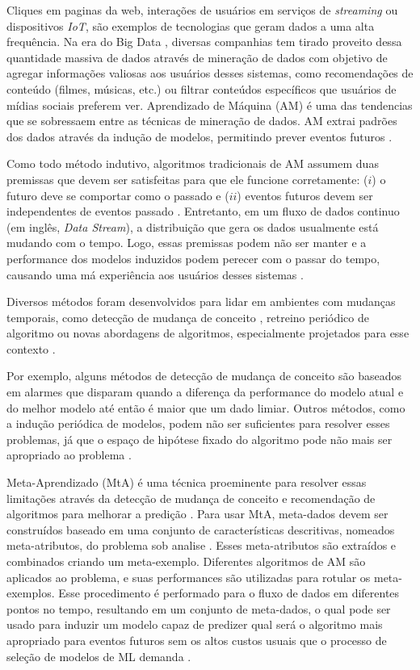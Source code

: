 Cliques em paginas da web, interações de usuários em serviços de \textit{streaming} ou dispositivos \textit{IoT}, são exemplos de tecnologias que geram dados a uma alta frequência.
Na era do Big Data \cite{tarnoff2018big, finger2014data},
diversas companhias tem tirado proveito dessa quantidade massiva de dados através de mineração de dados com objetivo de agregar informações valiosas aos usuários desses sistemas, como recomendações de conteúdo (filmes, músicas, etc.) ou filtrar conteúdos específicos que usuários de mídias sociais preferem ver. Aprendizado de Máquina (AM) é uma das tendencias que se sobressaem entre as técnicas de mineração de dados. AM extrai padrões dos dados através da indução de modelos, permitindo prever eventos futuros \cite{Mitchell1997}.

Como todo método indutivo, algoritmos tradicionais de AM assumem duas premissas que devem ser satisfeitas para que ele funcione corretamente: ($i$) o futuro deve se comportar como o passado e ($ii$) eventos futuros devem ser independentes de eventos passado \cite{vapnik2013nature}.
Entretanto, em um fluxo de dados continuo (em inglês, \textit{Data Stream}), a distribuição que gera os dados usualmente está mudando com o tempo.
Logo, essas premissas podem não ser manter e a performance dos modelos induzidos podem perecer com o passar do tempo, causando uma má experiência aos usuários desses sistemas  \cite{gama2007learning, Johansson2014}. 

Diversos métodos foram desenvolvidos para lidar em ambientes com mudanças temporais, como detecção de mudança de conceito \cite{klinkenberg2000detecting}, retreino periódico de algoritmo \cite{bifet2007learning} ou novas abordagens de algoritmos, especialmente projetados para esse contexto \cite{zang2014comparative}.

Por exemplo, alguns métodos de detecção de mudança de conceito \cite{gama2010knowledge} são baseados em alarmes que disparam quando a diferença da performance do modelo atual e do melhor modelo até então é maior que um dado limiar.
Outros métodos, como a indução periódica de modelos, podem não ser suficientes para resolver esses problemas, já que o espaço de hipótese fixado do algoritmo pode não mais ser apropriado ao problema \cite{rossi2014metastream}.

Meta-Aprendizado (MtA) é uma técnica proeminente para resolver essas limitações através da detecção de mudança de conceito e recomendação de algoritmos para melhorar a predição \cite{Anderson2019,VanRijn2016,Zarmehri2015}.
Para usar MtA, meta-dados devem ser construídos \cite{Vanschoren2018} baseado em uma conjunto de características descritivas, nomeados meta-atributos, do problema sob analise \cite{Rivolli2018}.
Esses meta-atributos são extraídos e combinados criando um meta-exemplo.
Diferentes algoritmos de AM são aplicados ao problema, e suas performances são utilizadas para rotular os meta-exemplos.
Esse procedimento é performado para o fluxo de dados em diferentes pontos no tempo, resultando em um conjunto de meta-dados, o qual pode ser usado para induzir um modelo capaz de predizer qual será o algoritmo mais apropriado para eventos futuros sem os altos custos usuais que o processo de seleção de modelos de ML demanda \cite{Munoz2018}.

